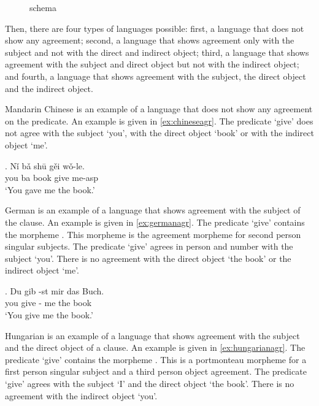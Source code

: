 \begin{figure}[H]
  \centering
  \caption{ schema}
  \label{fig:agr-sub-do-io}
\end{figure}

Then, there are four types of languages possible: first, a language that does not show any agreement; second, a language that shows agreement only with the subject and not with the direct and indirect object; third, a language that shows agreement with the subject and direct object but not with the indirect object; and fourth, a language that shows agreement with the subject, the direct object and the indirect object.

Mandarin Chinese is an example of a language that does not show any agreement on the predicate. An example is given in \ref{ex:chineseagr}. The predicate  `give' does not agree with the subject  `you', with the direct object  `book' or with the indirect object  `me'.

\exg. Nǐ bǎ shū gěi wǒ-le.\\
 you ba book give me-\ac{asp}\\
 `You gave me the book.' \label{ex:chineseagr}

German is an example of a language that shows agreement with the subject of the clause. An example is given in \ref{ex:germanagr}. The predicate  `give' contains the morpheme . This morpheme is the agreement morpheme for second person singular subjects. The predicate  `give' agrees in person and number with the subject  `you'. There is no agreement with the direct object  `the book' or the indirect object  `me'.

\exg. Du gib -st mir das Buch.\\
 you give - me the book\\
 `You give me the book.' \label{ex:germanagr}

Hungarian is an example of a language that shows agreement with the subject and the direct object of a clause. An example is given in \ref{ex:hungarianagr}. The predicate  `give' contains the morpheme . This is a portmonteau morpheme for a first person singular subject and a third person object agreement. The predicate  `give' agrees with the subject  `I' and the direct object  `the book'. There is no agreement with the indirect object  `you'.

